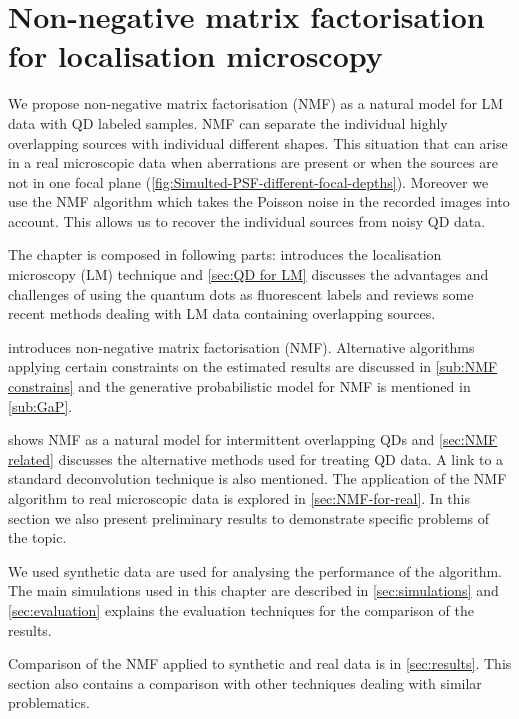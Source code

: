 \chapter{Non-negative matrix factorisation for localisation microscopy}
We propose non-negative matrix factorisation (NMF) as a natural model for LM data with QD labeled samples. NMF can separate the individual highly overlapping sources with individual different shapes. This situation that can arise in a real microscopic data when aberrations are present or when the sources are not in one focal plane (\autoref{fig:Simulted-PSF-different-focal-depths}). Moreover we use the NMF algorithm which takes the Poisson noise in the recorded images into account. This allows us to recover the individual sources from noisy QD data.

The chapter is composed in following parts:  introduces the localisation microscopy (LM) technique and \autoref{sec:QD for LM} discusses the advantages and challenges of using the quantum dots as fluorescent labels and reviews some recent methods dealing with LM data containing overlapping sources. 

 introduces non-negative matrix factorisation (NMF). Alternative algorithms applying certain constraints on the estimated results are discussed in \autoref{sub:NMF constrains} and the generative probabilistic model for NMF is mentioned in \autoref{sub:GaP}.

 shows NMF as a natural model for intermittent overlapping QDs and \autoref{sec:NMF related} discusses the alternative methods used for treating QD data. A link to a standard deconvolution technique is also mentioned. The application of the NMF algorithm to real microscopic data is explored in \autoref{sec:NMF-for-real}. In this section we also present preliminary results to demonstrate specific problems of the topic.

We used synthetic data are used for analysing the performance of the algorithm. The main simulations used in this chapter are described in \autoref{sec:simulations} and \autoref{sec:evaluation} explains the evaluation techniques for the comparison of the results.

Comparison of the NMF applied to synthetic and real data is in \autoref{sec:results}. This section also contains a comparison with other techniques dealing with similar problematics. 


